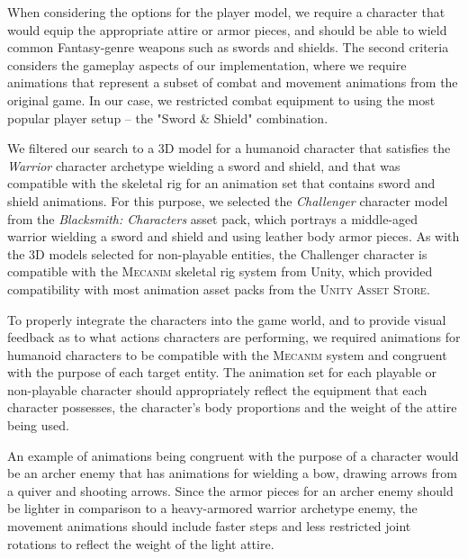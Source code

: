 

When considering the options for the player model, we require a character that would equip the appropriate attire or armor pieces, and should be able to wield common Fantasy-genre weapons such as swords and shields. The second criteria considers the gameplay aspects of our implementation, where we require animations that represent a subset of combat and movement animations from the original game. In our case, we restricted combat equipment to using the most popular player setup -- the "Sword \& Shield" combination.

We filtered our search to a 3D model for a humanoid character that satisfies the \emph{Warrior} character archetype wielding a sword and shield, and that was compatible with the skeletal rig for an animation set that contains sword and shield animations. For this purpose, we selected the \emph{Challenger} character model from the \emph{Blacksmith: Characters} asset pack, which portrays a middle-aged warrior wielding a sword and shield and using leather body armor pieces. As with the 3D models selected for non-playable entities, the Challenger character is compatible with the \textsc{Mecanim} skeletal rig system from Unity, which provided compatibility with most animation asset packs from the \textsc{Unity Asset Store}.

To properly integrate the characters into the game world, and to provide visual feedback as to what actions characters are performing, we required animations for humanoid characters to be compatible with the \textsc{Mecanim} system and congruent with the purpose of each target entity. The animation set for each playable or non-playable character should appropriately reflect the equipment that each character possesses, the character's body proportions and the weight of the attire being used.

An example of animations being congruent with the purpose of a character would be an archer enemy that has animations for wielding a bow, drawing arrows from a quiver and shooting arrows. Since the armor pieces for an archer enemy should be lighter in comparison to a heavy-armored warrior archetype enemy, the movement animations should include faster steps and less restricted joint rotations to reflect the weight of the light attire.

